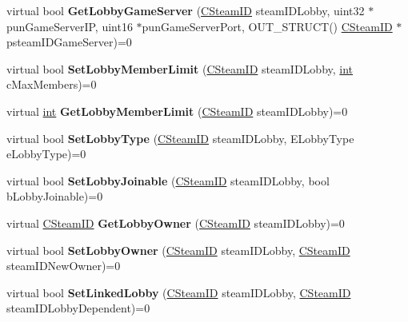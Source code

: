 \begin{DoxyCompactItemize}
\item 
\hypertarget{classISteamMatchmaking_a07494e80748d60c2ff2e42b360c07037}{}virtual bool {\bfseries Get\+Lobby\+Game\+Server} (\hyperlink{classCSteamID}{C\+Steam\+I\+D} steam\+I\+D\+Lobby, uint32 $\ast$pun\+Game\+Server\+I\+P, uint16 $\ast$pun\+Game\+Server\+Port, O\+U\+T\+\_\+\+S\+T\+R\+U\+C\+T() \hyperlink{classCSteamID}{C\+Steam\+I\+D} $\ast$psteam\+I\+D\+Game\+Server)=0\label{classISteamMatchmaking_a07494e80748d60c2ff2e42b360c07037}

\item 
\hypertarget{classISteamMatchmaking_a94cdc2b5934ac9d9ef1e46cff99567b6}{}virtual bool {\bfseries Set\+Lobby\+Member\+Limit} (\hyperlink{classCSteamID}{C\+Steam\+I\+D} steam\+I\+D\+Lobby, \hyperlink{SDL__thread_8h_a6a64f9be4433e4de6e2f2f548cf3c08e}{int} c\+Max\+Members)=0\label{classISteamMatchmaking_a94cdc2b5934ac9d9ef1e46cff99567b6}

\item 
\hypertarget{classISteamMatchmaking_a3960497e79085ce68298e1ca4df3db8b}{}virtual \hyperlink{SDL__thread_8h_a6a64f9be4433e4de6e2f2f548cf3c08e}{int} {\bfseries Get\+Lobby\+Member\+Limit} (\hyperlink{classCSteamID}{C\+Steam\+I\+D} steam\+I\+D\+Lobby)=0\label{classISteamMatchmaking_a3960497e79085ce68298e1ca4df3db8b}

\item 
\hypertarget{classISteamMatchmaking_a9d85958d0c5e4b297ddfc5e1002f7c71}{}virtual bool {\bfseries Set\+Lobby\+Type} (\hyperlink{classCSteamID}{C\+Steam\+I\+D} steam\+I\+D\+Lobby, E\+Lobby\+Type e\+Lobby\+Type)=0\label{classISteamMatchmaking_a9d85958d0c5e4b297ddfc5e1002f7c71}

\item 
\hypertarget{classISteamMatchmaking_a129730d6f22fa5846353eb6ef9b0884b}{}virtual bool {\bfseries Set\+Lobby\+Joinable} (\hyperlink{classCSteamID}{C\+Steam\+I\+D} steam\+I\+D\+Lobby, bool b\+Lobby\+Joinable)=0\label{classISteamMatchmaking_a129730d6f22fa5846353eb6ef9b0884b}

\item 
\hypertarget{classISteamMatchmaking_a265ce1a6914a06cb686fd03c2cbca392}{}virtual \hyperlink{classCSteamID}{C\+Steam\+I\+D} {\bfseries Get\+Lobby\+Owner} (\hyperlink{classCSteamID}{C\+Steam\+I\+D} steam\+I\+D\+Lobby)=0\label{classISteamMatchmaking_a265ce1a6914a06cb686fd03c2cbca392}

\item 
\hypertarget{classISteamMatchmaking_a48d0d64252c77988d56230ebc592d4b9}{}virtual bool {\bfseries Set\+Lobby\+Owner} (\hyperlink{classCSteamID}{C\+Steam\+I\+D} steam\+I\+D\+Lobby, \hyperlink{classCSteamID}{C\+Steam\+I\+D} steam\+I\+D\+New\+Owner)=0\label{classISteamMatchmaking_a48d0d64252c77988d56230ebc592d4b9}

\item 
\hypertarget{classISteamMatchmaking_a0d78ede35fb2a3faffa229d69ac3dadc}{}virtual bool {\bfseries Set\+Linked\+Lobby} (\hyperlink{classCSteamID}{C\+Steam\+I\+D} steam\+I\+D\+Lobby, \hyperlink{classCSteamID}{C\+Steam\+I\+D} steam\+I\+D\+Lobby\+Dependent)=0\label{classISteamMatchmaking_a0d78ede35fb2a3faffa229d69ac3dadc}

\end{DoxyCompactItemize}


